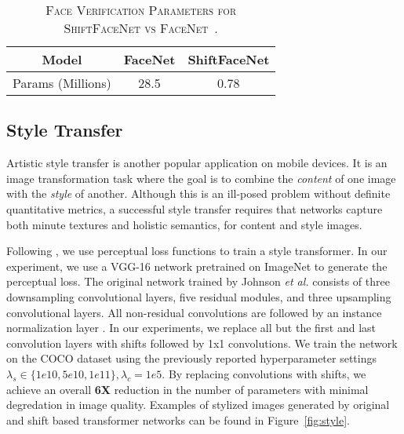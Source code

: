 \documentclass[10pt,twocolumn,letterpaper]{article}
\begin{document}
\begin{table}
\begin{center}
\caption{\textsc{Face Verification Parameters for ShiftFaceNet vs FaceNet~\cite{schroff2015facenet}.}}
\vspace{-0.1in}
\label{tab:face_parameter}
\begin{tabular}{c | c c}
Model & FaceNet & ShiftFaceNet \\
\hline
Params (Millions) & 28.5 & 0.78\\
\end{tabular}
\end{center}
\vspace{-.3in}
\end{table}

\subsection{Style Transfer}
Artistic style transfer is another popular application on mobile devices. It is an image transformation task where the goal is to combine the \textit{content} of one image with the \textit{style} of another. Although this is an ill-posed problem without definite quantitative metrics, a successful style transfer requires that networks capture both minute textures and holistic semantics, for content and style images.

Following \cite{gatys-style-transfer, johnson-style-transfer}, we use perceptual loss functions to train a style transformer. In our experiment, we use a VGG-16 network pretrained on ImageNet to generate the perceptual loss. The original network trained by Johnson \textit{et al.} \cite{johnson-style-transfer} consists of three downsampling convolutional layers, five residual modules, and three upsampling convolutional layers. All non-residual convolutions are followed by an instance normalization layer \cite{instance-norm}. In our experiments, we replace all but the first and last convolution layers with shifts followed by 1x1 convolutions. We train the network on the COCO \cite{coco} dataset using the previously reported hyperparameter settings $\lambda_s \in \{1e10, 5e10, 1e11\}, \lambda_c = 1e5$. By replacing convolutions with shifts, we achieve an overall \textbf{6X} reduction in the number of parameters with minimal degredation in image quality. Examples of stylized images generated by original and shift based transformer networks can be found in Figure~\ref{fig:style}.
\end{document}
